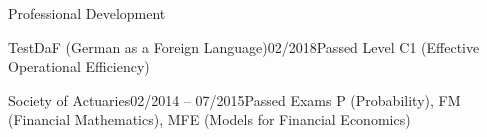 \documentclass{resume}
\begin{document}
    \begin{cvSection}{Professional Development}

        \begin{cvSubsection}{TestDaF (German as a Foreign Language)}{02/2018}{Passed Level C1 (Effective Operational Efficiency)}{}
        \end{cvSubsection}

        \begin{cvSubsection}{Society of Actuaries}{02/2014 -- 07/2015}{Passed Exams P (Probability), FM (Financial Mathematics), MFE (Models for Financial Economics)}{}
        \end{cvSubsection}

    \end {cvSection}
\end{document}
